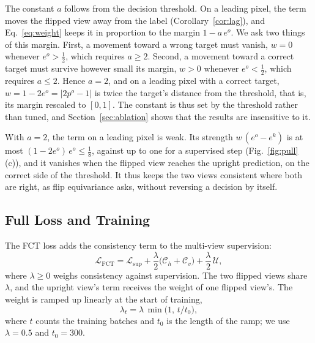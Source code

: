 The constant $a$ follows from the decision threshold. On a leading pixel, the term moves the flipped
view away from the label (Corollary~\ref{cor:lag}), and Eq.~\eqref{eq:weight} keeps it in proportion to
the margin $1-a\,e^{o}$. We ask two things of this margin. First, a movement toward a wrong target must
vanish, $w=0$ whenever $e^{o}>\frac12$, which requires $a\geq2$. Second, a movement toward a correct
target must survive however small its margin, $w>0$ whenever $e^{o}<\frac12$, which requires
$a\leq2$. Hence $a=2$, and on a leading pixel with a correct target, $w=1-2e^{o}=|2p^{o}-1|$ is twice
the target's distance from the threshold, that is, its margin rescaled to $[0,1]$. The constant is thus
set by the threshold rather than tuned, and Section~\ref{sec:ablation} shows that the results are
insensitive to it.

With $a=2$, the term on a leading pixel is weak. Its strength $w\,(e^{o}-e^{k})$ is at most
$(1-2e^{o})\,e^{o}\leq\frac18$, against up to one for a supervised step (Fig.~\ref{fig:pull}(c)), and it
vanishes when the flipped view reaches the upright prediction, on the correct side of the threshold. It
thus keeps the two views consistent where both are right, as flip equivariance asks, without reversing a
decision by itself.

\subsection{Full Loss and Training}
\label{sec:objective}

The FCT loss adds the consistency term to the multi-view supervision:
\begin{equation}
\mathcal{L}_{\mathrm{FCT}}=\mathcal{L}_{\mathrm{sup}}+\frac{\lambda}{2}\big(\mathcal{C}_h+\mathcal{C}_v\big)+\frac{\lambda}{2}\,\mathcal{U},
\label{eq:objective}
\end{equation}
where $\lambda\geq0$ weighs consistency against supervision. The two flipped views share $\lambda$, and
the upright view's term receives the weight of one flipped view's. The weight is ramped up linearly at
the start of training,
\begin{equation}
\lambda_t=\lambda\,\min\big(1,\,t/t_0\big),
\label{eq:ramp}
\end{equation}
where $t$ counts the training batches and $t_0$ is the length of the ramp; we use $\lambda=0.5$ and
$t_0=300$.

